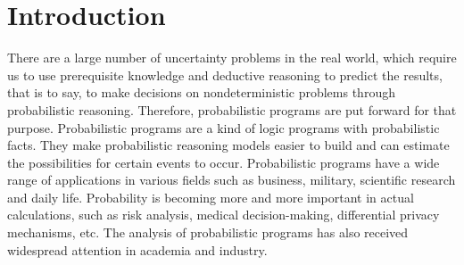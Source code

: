 \documentclass[sigconf,review, anonymous]{acmart}
\newcommand\leaveout[1]{}
\begin{document}
\leaveout{
%
%
\begin{CCSXML}
<ccs2012>
 <concept>
  <concept_id>10010520.10010553.10010562</concept_id>
  <concept_desc>Computer systems organization~Embedded systems</concept_desc>
  <concept_significance>500</concept_significance>
 </concept>
 <concept>
  <concept_id>10010520.10010575.10010755</concept_id>
  <concept_desc>Computer systems organization~Redundancy</concept_desc>
  <concept_significance>300</concept_significance>
 </concept>
 <concept>
  <concept_id>10010520.10010553.10010554</concept_id>
  <concept_desc>Computer systems organization~Robotics</concept_desc>
  <concept_significance>100</concept_significance>
 </concept>
 <concept>
  <concept_id>10003033.10003083.10003095</concept_id>
  <concept_desc>Networks~Network reliability</concept_desc>
  <concept_significance>100</concept_significance>
 </concept>
</ccs2012>  
\end{CCSXML}
}





\maketitle


\section{Introduction}
There are a large number of uncertainty problems in the real world, which require us to use prerequisite knowledge and deductive reasoning to predict the results, that is to say, to make decisions on nondeterministic problems through probabilistic reasoning. Therefore, probabilistic programs are put forward for that purpose. Probabilistic programs are a kind of logic programs with probabilistic facts. They make probabilistic reasoning models easier to build and can estimate the possibilities  for certain events to occur.
Probabilistic programs have a wide range of applications in various fields such as business, military, scientific research and daily life. Probability is becoming more and more important in actual calculations, such as risk analysis, medical decision-making, differential privacy mechanisms, etc. The analysis of probabilistic programs has also received widespread attention in academia and industry. %
\end{document}
